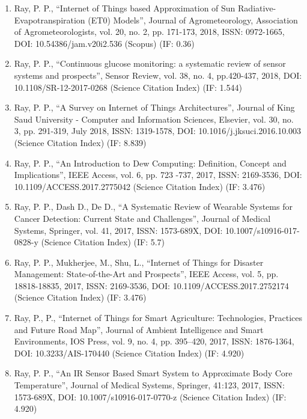 \documentclass[11pt,a4paper]{moderncv}
\begin{document}
\begin{adjustwidth}{6em}{0pt}
\begin{enumerate}
		\item Ray, P. P., “Internet of Things based Approximation of Sun Radiative-Evapotranspiration (ET0) Models”, Journal of Agrometeorology, Association of Agrometeorologists, vol. 20, no. 2, pp. 171-173, 2018, ISSN: 0972-1665, DOI: 10.54386/jam.v20i2.536 (Scopus) (IF: 0.36)
		
		\item Ray, P. P., “Continuous glucose monitoring: a systematic review of sensor systems and prospects”, Sensor Review, vol. 38, no. 4, pp.420-437, 2018, DOI: 10.1108/SR-12-2017-0268 (Science Citation Index) (IF: 1.544)
		
		\item Ray, P. P., “A Survey on Internet of Things Architectures”, Journal of King Saud University - Computer and Information Sciences, Elsevier, vol. 30, no. 3, pp. 291-319, July 2018, ISSN: 1319-1578, DOI: 10.1016/j.jksuci.2016.10.003 (Science Citation Index) (IF: 8.839)
		
		\item Ray, P. P., “An Introduction to Dew Computing: Definition, Concept and Implications”, IEEE Access, vol. 6, pp. 723 -737, 2017, ISSN: 2169-3536, DOI: 10.1109/ACCESS.2017.2775042 (Science Citation Index) (IF: 3.476)
		
		\item Ray, P. P., Dash D., De D., “A Systematic Review of Wearable Systems for Cancer Detection: Current State and Challenges”, Journal of Medical Systems, Springer, vol. 41, 2017, ISSN: 1573-689X, DOI: 10.1007/s10916-017-0828-y (Science Citation Index) (IF: 5.7)
		
		\item Ray, P. P., Mukherjee, M., Shu, L., “Internet of Things for Disaster Management: State-of-the-Art and Prospects”, IEEE Access, vol. 5, pp. 18818-18835, 2017, ISSN: 2169-3536, DOI: 10.1109/ACCESS.2017.2752174 (Science Citation Index) (IF: 3.476)
		
		\item Ray, P., P., “Internet of Things for Smart Agriculture: Technologies, Practices and Future Road Map”, Journal of Ambient Intelligence and Smart Environments, IOS Press, vol. 9, no. 4, pp. 395–420, 2017, ISSN: 1876-1364, DOI: 10.3233/AIS-170440 (Science Citation Index) (IF: 4.920)
		
		\item Ray, P. P., “An IR Sensor Based Smart System to Approximate Body Core Temperature”, Journal of Medical Systems, Springer, 41:123, 2017, ISSN: 1573-689X, DOI: 10.1007/s10916-017-0770-z (Science Citation Index) (IF: 4.920)
		

\end{enumerate}
\end{adjustwidth}
\end{document}
